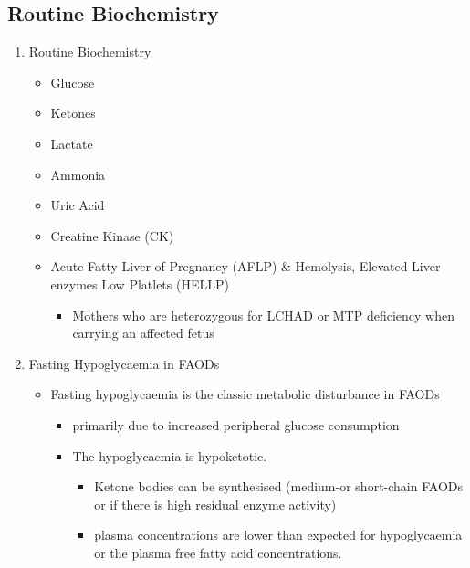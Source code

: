 \documentclass{scrartcl}
\begin{document}
\subsection{Routine Biochemistry}
\label{sec:org461bca7}
\begin{enumerate}
\item Routine Biochemistry
\label{sec:orgc8edbf6}
\begin{itemize}
\item Glucose
\item Ketones
\item Lactate
\item Ammonia
\item Uric Acid
\item Creatine Kinase (CK)
\item Acute Fatty Liver of Pregnancy (AFLP) \& Hemolysis, Elevated Liver enzymes Low Platlets (HELLP)
\begin{itemize}
\item Mothers who are heterozygous for LCHAD or MTP deficiency when
carrying an affected fetus
\end{itemize}
\end{itemize}
\item Fasting Hypoglycaemia  in FAODs
\label{sec:org77de1aa}
\begin{itemize}
\item Fasting hypoglycaemia is the classic metabolic disturbance in FAODs
\begin{itemize}
\item primarily due to increased peripheral glucose consumption
\end{itemize}
\begin{itemize}
\item The hypoglycaemia is hypoketotic.
\begin{itemize}
\item Ketone bodies can be synthesised (medium-or short-chain FAODs or
if there is high residual enzyme activity)
\item plasma concentrations are lower than expected for hypoglycaemia or
the plasma free fatty acid concentrations.
\end{itemize}
\end{itemize}
\end{itemize}


\end{enumerate}
\end{document}
